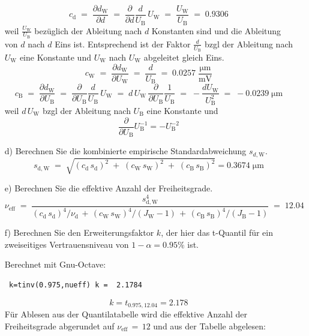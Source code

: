 \begin{itemize}
$$
c_\mathrm{d} \; = \; \frac{\partial d_\mathrm{W}}{\partial d}
\; = \; \frac{\partial}{\partial d} \frac{d}{U_\mathrm{B}} \, U_\mathrm{W}
\; = \; \frac{U_\mathrm{W}}{U_\mathrm{B}} \; =  \; 0.9306
$$
weil $\frac{U_\mathrm{W}}{U_\mathrm{B}}$ bezüglich der Ableitung nach $d$ Konstanten sind und die Ableitung von $d$
nach $d$ Eins ist. Entsprechend ist der Faktor $\frac{d}{U_\mathrm{B}}$ bzgl der Ableitung nach $U_\mathrm{W}$ eine
Konstante und $U_\mathrm{W}$ nach $U_\mathrm{W}$ abgeleitet gleich Eins.
$$
c_\mathrm{W} \; = \; \frac{\partial d_\mathrm{W}}{\partial U_\mathrm{W}} \; = \; \frac{d}{U_\mathrm{B}} \; = \;  0.0257 \; \frac{\mathrm{\mu m}}{\mathrm{mV}}
$$
$$
c_\mathrm{B} \; = \; \frac{\partial d_\mathrm{W}}{\partial U_\mathrm{B}}
\; = \; \frac{\partial}{\partial U_\mathrm{B}} \frac{d}{U_\mathrm{B}} \, U_\mathrm{W}
\; = \; d \, U_\mathrm{W} \, \frac{\partial}{\partial U_\mathrm{B}} \frac{1}{U_\mathrm{B}}
\; = \; -\frac{d U_\mathrm{W}}{U_\mathrm{B}^2} \; = \;  -0.0239 \; \mathrm{\mu m}
$$
weil $d \, U_\mathrm{W}$ bzgl der Ableitung nach $U_\mathrm{B}$ eine Konstante und
$$
 \frac{\partial}{\partial U_\mathrm{B}} U_\mathrm{B}^{-1} = -U_\mathrm{B}^{-2}
$$
\item[d)] Berechnen Sie die kombinierte empirische Standardabweichung $s_{d,\mathrm{W}}$.
$$
s_{\mathrm{d},\mathrm{W}} \; = \; \sqrt{(c_\mathrm{d} \, s_\mathrm{d})^2 \; + \; (c_\mathrm{W} \, s_\mathrm{W})^2 \; + \; (c_\mathrm{B} \, s_\mathrm{B})^2} =    0.3674 \; \mathrm{\mu m}
$$
\item[e)] Berechnen Sie die effektive Anzahl der Freiheitsgrade.
$$
\nu_\mathrm{eff} \; = \; \frac{s_{\mathrm{d},\mathrm{W}}^4}{(c_\mathrm{d} \, s_\mathrm{d})^4/\nu_\mathrm{d} \, + \, (c_\mathrm{W} \, s_\mathrm{W})^4/(J_\mathrm{W}-1) \, + \, (c_\mathrm{B} \, s_\mathrm{B})^4/(J_\mathrm{B}-1)} \; = \; 12.04
$$
\item[f)] Berechnen Sie den Erweiterungsfaktor $k$, der
 hier das t-Quantil für ein zweiseitiges Vertrauensniveau
 von $1-\alpha = 0.95\%$ ist.

Berechnet mit Gnu-Octave:
\begin{verbatim}
 k=tinv(0.975,nueff) k =  2.1784
\end{verbatim}
$$
k = t_{0.975,12.04} = 2.178
$$
Für Ablesen aus der Quantilatabelle wird die effektive Anzahl der Freiheitsgrade abgerundet auf $\nu_\mathrm{eff} \, = \, 12$
und aus der Tabelle abgelesen:


\end{itemize}
